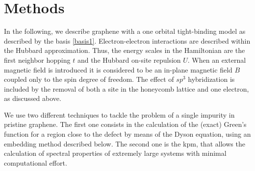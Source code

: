 \section{Methods}
\label{sec:GF}
In the following, we describe graphene with a one orbital tight-binding model as described by the basis \eqref{basis1}. Electron-electron interactions are described within the Hubbard approximation. Thus, the energy scales in the Hamiltonian are the first neighbor hopping $t$ and the Hubbard on-site repulsion $U$. When an external magnetic field is introduced it is considered to be an in-plane magnetic field $B$ coupled only to the spin degree of freedom.
The effect of $sp^3$ hybridization is included by the removal of both a site in the honeycomb lattice and one electron, as discussed above.

We use two different techniques to tackle the problem of a single impurity in pristine graphene. The first one consists in the calculation of the (exact) Green's function for a region close to the defect by means of the Dyson equation, using an embedding method described below.
The second one is the \acf{kpm}, that allows the calculation of spectral properties of extremely large systems with minimal computational effort.



